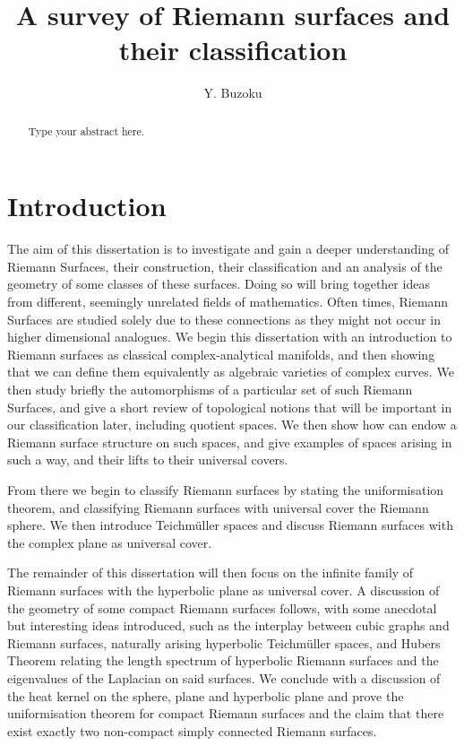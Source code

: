 \documentclass[11pt]{report}
\title{A survey of Riemann surfaces and their classification}
\author{Y. Buzoku}
\theoremstyle{definition}
\begin{document}
\maketitle
\tableofcontents

\newpage
\begin{abstract}
Type your abstract here.
\end{abstract}
\declaration %
\chapter{Introduction}

The aim of this dissertation is to investigate and gain a deeper
understanding of
Riemann Surfaces, their construction, their classification and an analysis
of the
geometry of some classes of these surfaces. Doing so will bring together
ideas
from different, seemingly unrelated fields of mathematics. Often times,
Riemann
Surfaces are studied solely due to these connections as they might not
occur in
higher dimensional analogues. We begin this dissertation with an
introduction to
Riemann surfaces as classical complex-analytical manifolds, and then
showing that
we can define them equivalently as algebraic varieties of complex curves.
We then 
study briefly the automorphisms of a particular set of such Riemann
Surfaces, and 
give a short review of topological notions that will be important in our 
classification later, including quotient spaces. We then show how can
endow a 
Riemann surface structure on such spaces, and give examples of spaces
arising in such a way, and their lifts to their universal covers.

From there we begin to classify Riemann surfaces by stating the
uniformisation 
theorem, and classifying Riemann surfaces with universal cover the Riemann
sphere. We then introduce Teichm\"{u}ller spaces and discuss Riemann
surfaces with the complex plane as universal cover.

The remainder of this dissertation will then focus on the infinite family
of Riemann surfaces with the hyperbolic plane as universal cover. A
discussion of the geometry of some compact Riemann surfaces follows, with
some anecdotal but interesting ideas introduced, such as the interplay
between cubic graphs and Riemann surfaces, naturally arising hyperbolic
Teichm\"{u}ller spaces, and Hubers Theorem relating the length spectrum of
hyperbolic Riemann surfaces and the eigenvalues of the Laplacian on said
surfaces. We conclude with a discussion of the heat kernel on the sphere,
plane and hyperbolic plane and prove the uniformisation theorem for
compact Riemann surfaces and the claim that there exist exactly two
non-compact simply connected Riemann surfaces.
\end{document}
